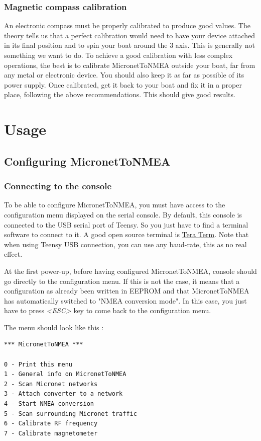 \documentclass{report}
\begin{document}
\subsection{Magnetic compass calibration}
An electronic compass must be properly calibrated to produce good values. The theory tells us that a perfect calibration would need to have your device attached in its final position and to spin your boat around the 3 axis. This is generally not something we want to do. To achieve a good calibration with less complex operations, the best is to calibrate MicronetToNMEA outside your boat, far from any metal or electronic device. You should also keep it as far as possible of its power supply. Once calibrated, get it back to your boat and fix it in a proper place, following the above recommendations. This should give good results.

\chapter{Usage}

\section{Configuring MicronetToNMEA}

\subsection{Connecting to the console}

To be able to configure MicronetToNMEA, you must have access to the configuration menu displayed on the serial console. By default, this console is connected to the USB serial port of Teensy. So you just have to find a terminal software to connect to it. A good open source terminal is \href{http://www.teraterm.org/}{Tera Term}. Note that when using Teensy USB connection, you can use any baud-rate, this as no real effect.

At the first power-up, before having configured MicronetToNMEA, console should go directly to the configuration menu. If this is not the case, it means that a configuration as already been written in EEPROM and that MicronetToNMEA has automatically switched to "NMEA conversion mode". In this case, you just have to press \emph{<ESC>} key to come back to the configuration menu.

The menu should look like this :

\begin{verbatim}
*** MicronetToNMEA ***

0 - Print this menu
1 - General info on MicronetToNMEA
2 - Scan Micronet networks
3 - Attach converter to a network
4 - Start NMEA conversion
5 - Scan surrounding Micronet traffic
6 - Calibrate RF frequency
7 - Calibrate magnetometer
\end{verbatim}
\end{document}

